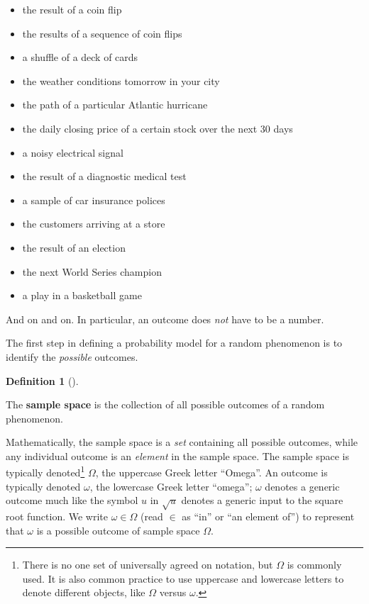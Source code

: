 \documentclass[
  letterpaper,
  DIV=11,
  numbers=noendperiod]{scrreprt}
\providecommand{\tightlist}{%
  \setlength{\itemsep}{0pt}\setlength{\parskip}{0pt}}
\theoremstyle{plain}
\theoremstyle{definition}
\theoremstyle{definition}
\theoremstyle{definition}
\newtheorem{definition}{Definition}[chapter]
\theoremstyle{remark}
\begin{document}
\begin{itemize}
\tightlist
\item
  the result of a coin flip
\item
  the results of a sequence of coin flips
\item
  a shuffle of a deck of cards
\item
  the weather conditions tomorrow in your city
\item
  the path of a particular Atlantic hurricane
\item
  the daily closing price of a certain stock over the next 30 days
\item
  a noisy electrical signal
\item
  the result of a diagnostic medical test
\item
  a sample of car insurance polices
\item
  the customers arriving at a store
\item
  the result of an election
\item
  the next World Series champion
\item
  a play in a basketball game
\end{itemize}

And on and on. In particular, an outcome does \emph{not} have to be a
number.

The first step in defining a probability model for a random phenomenon
is to identify the \emph{possible} outcomes.

\begin{definition}[]\protect\hypertarget{def-sample-space}{}\label{def-sample-space}

The \textbf{sample space} is the collection of all
possible outcomes of a random phenomenon.

\end{definition}

Mathematically, the sample space is a \emph{set} containing all possible
outcomes, while any individual outcome is an \emph{element} in the
sample space. The sample space is typically denoted\footnote{There is no
  one set of universally agreed on notation, but \(\Omega\) is commonly
  used. It is also common practice to use uppercase and lowercase
  letters to denote different objects, like \(\Omega\) versus
  \(\omega\).} \(\Omega\), the uppercase Greek letter ``Omega''. An
outcome is typically denoted \(\omega\), the lowercase Greek letter
``omega''; \(\omega\) denotes a generic outcome much like the symbol
\(u\) in \(\sqrt{u}\) denotes a generic input to the square root
function. We write \(\omega \in \Omega\) (read \(\in\) as ``in'' or ``an
element of'') to represent that \(\omega\) is a possible outcome of
sample space \(\Omega\).
\end{document}
